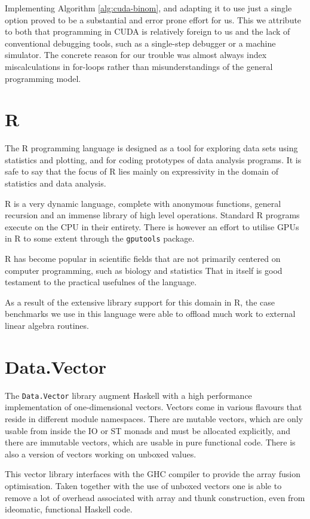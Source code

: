 Implementing Algorithm \ref{alg:cuda-binom}, and adapting it to use just a
single option proved to be a substantial and error prone effort for us. This we
attribute to both that programming in CUDA is relatively foreign to us and the
lack of conventional debugging tools, such as a single-step debugger or a
machine simulator. The concrete reason for our trouble was almost always index
miscalculations in for-loops rather than misunderstandings of the general
programming model.

\section{R}

The R programming language is designed as a tool for exploring data sets using
statistics and plotting, and for coding prototypes of data analysis programs.
It is safe to say that the focus of R lies mainly on expressivity in the domain
of statistics and data analysis.

R is a very dynamic language, complete with anonymous functions, general
recursion and an immense library of high level operations. Standard R programs
execute on the CPU in their entirety. There is however an effort to utilise
GPUs in R to some extent through the \texttt{gputools}
package\cite{crangputools}.

R has become popular in scientific fields that are not primarily centered on
computer programming, such as biology and statistics
That in itself is good testament to the practical usefulnes of the language.

As a result of the extensive library support for this domain in R, the case
benchmarks we use in this language were able to offload much work to external
linear algebra routines.

\section{Data.Vector}

The \texttt{Data.Vector} library augment Haskell with a high performance
implementation of one-dimensional vectors. Vectors come in various flavours
that reside in different module namespaces. There are mutable vectors, which
are only usable from inside the IO or ST monads and must be allocated
explicitly, and there are immutable vectors, which are usable in pure
functional code. There is also a version of vectors working on unboxed values.

This vector library interfaces with the GHC compiler to provide the array
fusion optimisation. Taken together with the use of unboxed vectors one is able
to remove a lot of overhead associated with array and thunk construction, even
from ideomatic, functional Haskell code.

